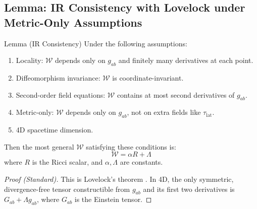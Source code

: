 
\subsection{Lemma: IR Consistency with Lovelock under Metric-Only Assumptions}

\begin{mytheorem}{Lemma (IR Consistency)}
\label{lemma:lovelock-consistency}
Under the following assumptions:
\begin{enumerate}
    \item Locality: $\mathcal{W}$ depends only on $g_{ab}$ and finitely many derivatives at each point.
    \item Diffeomorphism invariance: $\mathcal{W}$ is coordinate-invariant.
    \item Second-order field equations: $\mathcal{W}$ contains at most second derivatives of $g_{ab}$.
    \item Metric-only: $\mathcal{W}$ depends only on $g_{ab}$, not on extra fields like $\tau_{\mathrm{lat}}$.
    \item 4D spacetime dimension.
\end{enumerate}
Then the most general $\mathcal{W}$ satisfying these conditions is:
\begin{equation}
\mathcal{W} = \alpha R + \Lambda
\end{equation}
where $R$ is the Ricci scalar, and $\alpha, \Lambda$ are constants.
\end{mytheorem}

\begin{proof}[Proof (Standard)]
This is Lovelock's theorem \cite{Lovelock1971, Lovelock1972}. In 4D, the only symmetric, divergence-free tensor constructible from $g_{ab}$ and its first two derivatives is $G_{ab} + \Lambda g_{ab}$, where $G_{ab}$ is the Einstein tensor.
\end{proof}

